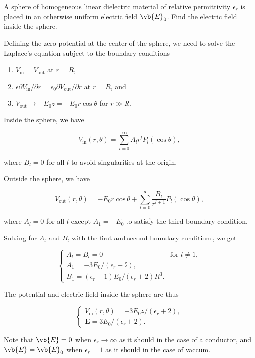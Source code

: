 \documentclass[english,a4paper,12pt]{report}
\begin{document}
{A sphere of homogeneous linear dielectric material of relative permittivity \(\epsilon _{r} \) is placed in an otherwise uniform electric field \(\vb{E} _{0} \). Find the electric field inside the sphere.}
{Defining the zero potential at the center of the sphere, we need to solve the Laplace's equation subject to the boundary conditions

\begin{enumerate}[itemsep=10pt] 
    \item $V_{\text{in}} = V_{\text{out}}$ at $r = R$,
    \item \(\epsilon \partial V_{\text{in} } / \partial r = \epsilon _{0} \partial V_{\text{out} } /\partial r  \)  at $r = R$, and
    \item $V_{\text{out}} \to -E_0 z = -E_0 r \cos\theta$ for $r \gg R$.
\end{enumerate}

Inside the sphere, we have

\begin{equation}
    V_{\text{in} }(r, \theta ) = \sum_{l=0}^{\infty} A_{l} r^{l}P_{l}(\cos \theta ),
\end{equation}

where \(B_{l} = 0\) for all \(l\) to avoid singularities at the origin. 

Outside the sphere, we have

\begin{equation}
    V_{\text{out} }(r,\theta ) = -E_0 r\cos \theta + \sum_{l=0}^{\infty}\frac{B_{l} }{r^{l+1} }P_{l}(\cos \theta ),   
\end{equation}

where \(A_{l} = 0 \) for all \(l\) except \(A_1 = -E_0 \) to satisfy the third boundary condition.

Solving for \(A_{l} \text { and } B_{l}  \) with the first and second boundary conditions, we get 

\begin{equation}
    \begin{cases}
        A_l = B_l = 0 & \text{for } l \neq 1, \\[10pt]
        A_1 = - 3E_0 / (\epsilon _{r}+2 ), \\[10pt]
        B_1 = (\epsilon _{r}-1 )E_0 /(\epsilon _{r}+2 )R^3.
        \end{cases}   
\end{equation}

The potential and electric field inside the sphere are thus

\begin{equation}
    \begin{cases}
        V_\text{in}(r, \theta) = -3 E_0 z /(\epsilon _{r}+2 ), \\[10pt]
        \mathbf{E} = 3E_0 /(\epsilon _{r}+2 ).
        \end{cases}
\end{equation}

Note that \(\vb{E} = 0\) when \(\epsilon _{r} \to \infty\) as it should in the case of a conductor, and \(\vb{E} = \vb{E} _{0} \) when \(\epsilon _{r} = 1 \) as it should in the case of vaccum.    
} 
\end{document}
